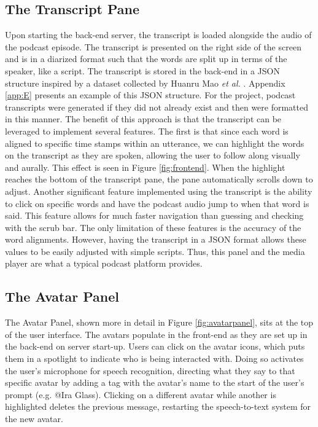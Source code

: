 \documentclass[12pt]{report}
\begin{document}
\begin{myfont}
        \subsection{The Transcript Pane}
        Upon starting the back-end server, the transcript is loaded alongside the audio of the podcast episode. The transcript is presented on the right side of the screen and is in a diarized format such that the words are split up in terms of the speaker, like a script. The transcript is stored in the back-end in a JSON structure inspired by a dataset collected by Huanru Mao \textit{et al.} \citep{Mao2020SpeechRecognition}. Appendix \ref{app:E} presents an example of this JSON structure. For the project, podcast transcripts were generated if they did not already exist and then were formatted in this manner. The benefit of this approach is that the transcript can be leveraged to implement several features. The first is that since each word is aligned to specific time stamps within an utterance, we can highlight the words on the transcript as they are spoken, allowing the user to follow along visually and aurally. This effect is seen in Figure \ref{fig:frontend}. When the highlight reaches the bottom of the transcript pane, the pane automatically scrolls down to adjust. Another significant feature implemented using the transcript is the ability to click on specific words and have the podcast audio jump to when that word is said. This feature allows for much faster navigation than guessing and checking with the scrub bar. The only limitation of these features is the accuracy of the word alignments. However, having the transcript in a JSON format allows these values to be easily adjusted with simple scripts. Thus, this panel and the media player are what a typical podcast platform provides.
        
        \subsection{The Avatar Panel}
        \indent The Avatar Panel, shown more in detail in Figure \ref{fig:avatarpanel}, sits at the top of the user interface. The avatars populate in the front-end as they are set up in the back-end on server start-up. Users can click on the avatar icons, which puts them in a spotlight to indicate who is being interacted with. Doing so activates the user's microphone for speech recognition, directing what they say to that specific avatar by adding a tag with the avatar's name to the start of the user's prompt (e.g. @Ira Glass). Clicking on a different avatar while another is highlighted deletes the previous message, restarting the speech-to-text system for the new avatar. 
        

\end{myfont}
\end{document}
